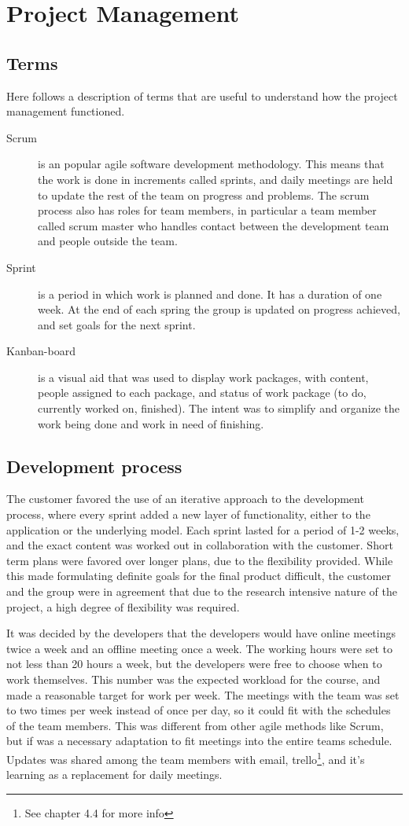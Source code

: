 \chapter{Project Management}
\section{Terms}
Here follows a description of terms that are useful to understand how the project management functioned. 

\begin{description}
\item[Scrum] is an popular agile software development methodology. This means that the work is done in increments called sprints, and daily meetings are held to update the rest of the team on progress and problems. The scrum process also has roles for team members, in particular a team member called scrum master who handles contact between the development team and people outside the team.

\item[Sprint] is a period in which work is planned and done. It has a duration of one week. At the end of each spring the group is updated on progress achieved, and set goals for the next sprint. 
\item[Kanban-board] is a visual aid that was used to display work packages, with content, people assigned to each package, and status of work package (to do, currently worked on, finished). The intent was to simplify and organize the work being done and work in need of finishing.
\end{description}
\section{Development process}

The customer favored the use of an iterative approach to the development process, where every sprint added a new layer of functionality, either to the application or the underlying model. Each sprint lasted for a period of 1-2 weeks, and the exact content was worked out in collaboration with the customer. Short term plans were favored over longer plans, due to the flexibility provided. While this made formulating definite goals for the final product difficult, the customer and the group were in agreement that due to the research intensive nature of the project, a high degree of flexibility was required. 

It was decided by the developers that the developers would have online meetings twice a week and an offline meeting once a week. 
The working hours were set to not less than 20 hours a week, but the developers were free to choose when to work themselves. This number was the expected workload for the course, and made a reasonable target for work per week. The meetings with the team was set to two times per week instead of once per day, so it could fit with the schedules of the team members. This was different from other agile methods like Scrum, but if was a necessary adaptation to fit meetings into the entire teams schedule. Updates was shared among the team members with email, trello\footnote{See chapter 4.4 for more info}, and it's learning as a replacement for daily meetings.


